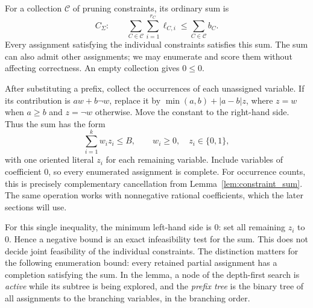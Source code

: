 \documentclass[11pt,a4paper]{article}
\theoremstyle{definition}
\theoremstyle{remark}
\newcommand{\bits}{\{0,1\}}
\begin{document}
For a collection $\mathcal C$ of pruning constraints, its ordinary
sum is
\begin{equation}
 C_\Sigma:\qquad
 \sum_{C\in\mathcal C}\sum_{i=1}^{r_C}\ell_{C,i}
       \le \sum_{C\in\mathcal C}b_C.
 \label{eq:ordinary_sum}
\end{equation}
Every assignment satisfying the individual constraints satisfies this sum.
The sum can also admit other assignments; we may enumerate and score them
without affecting correctness. An empty collection gives $0\le0$.

After substituting a prefix, collect the occurrences of each unassigned
variable. If its contribution is $aw+b\neg w$, replace it by
$\min(a,b)+|a-b|z$, where $z=w$ when $a\ge b$ and $z=\neg w$ otherwise.
Move the constant to the right-hand side. Thus the sum has the form
\begin{equation}
 \sum_{i=1}^k w_i z_i\le B,\qquad w_i\ge0,\quad z_i\in\bits,
 \label{eq:budget}
\end{equation}
with one oriented literal $z_i$ for each remaining variable. Include
variables of coefficient $0$, so every enumerated assignment is complete.
For occurrence counts, this is precisely complementary cancellation from
Lemma~\ref{lem:constraint_sum}. The same operation works with nonnegative
rational coefficients, which the later sections will use.

For this single inequality, the minimum left-hand side is $0$: set all
remaining $z_i$ to $0$. Hence a negative bound is an exact infeasibility
test for the sum. This does not decide joint feasibility of the individual
constraints. The distinction matters for the following enumeration bound:
every retained partial assignment has a completion satisfying the sum.
In the lemma, a node of the depth-first search is \emph{active} while its
subtree is being explored, and the \emph{prefix tree} is the binary tree of
all assignments to the branching variables, in the branching order.
\end{document}

